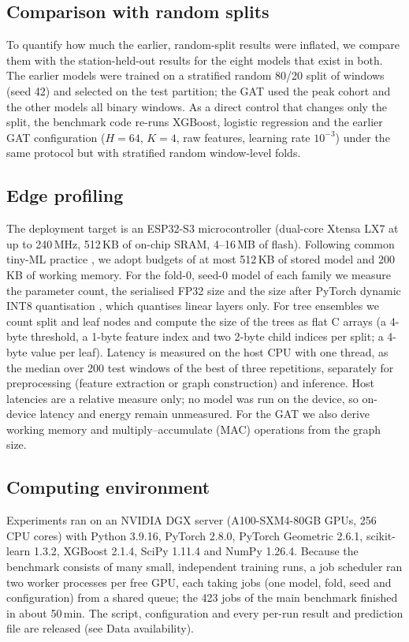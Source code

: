 \documentclass[a4paper,fleqn]{cas-dc}
\begin{document}
\subsection{Comparison with random splits}\label{sec:random-method}
To quantify how much the earlier, random-split results were inflated, we compare them
with the station-held-out results for the eight models that exist in both. The earlier
models were trained on a stratified random 80/20 split of windows (seed 42) and selected
on the test partition; the GAT used the peak cohort and the other models all binary
windows. As a direct control that changes only the split, the benchmark code re-runs
XGBoost, logistic regression and the earlier GAT configuration ($H=64$, $K=4$, raw
features, learning rate $10^{-3}$) under the same protocol but with stratified random
window-level folds. %

\subsection{Edge profiling}\label{sec:edge-method}
The deployment target is an ESP32-S3 microcontroller (dual-core Xtensa LX7 at up to
240\,MHz, 512\,KB of on-chip SRAM, 4--16\,MB of flash). Following common tiny-ML practice
\citep{banbury2021}, we adopt budgets of at most 512\,KB of stored model and 200\,KB of
working memory. For the fold-0, seed-0 model of each family we measure the parameter
count, the serialised FP32 size and the size after PyTorch dynamic INT8 quantisation
\citep{jacob2018}, which quantises linear layers only. For tree ensembles we count split
and leaf nodes and compute the size of the trees as flat C arrays (a 4-byte threshold,
a 1-byte feature index and two 2-byte child indices per split; a 4-byte value per leaf).
Latency is measured on the host CPU with one thread, as the median over 200 test windows
of the best of three repetitions, separately for preprocessing (feature extraction or
graph construction) and inference. Host latencies are a relative measure only; no model
was run on the device, so on-device latency and energy remain unmeasured. For the GAT we
also derive working memory and multiply--accumulate (MAC) operations from the graph size.

\subsection{Computing environment}\label{sec:env}
Experiments ran on an NVIDIA DGX server (A100-SXM4-80GB GPUs, 256 CPU cores) with
Python 3.9.16, PyTorch 2.8.0, PyTorch Geometric 2.6.1, scikit-learn 1.3.2, XGBoost 2.1.4,
SciPy 1.11.4 and NumPy 1.26.4. Because the benchmark consists of many small, independent
training runs, a job scheduler ran two worker processes per free GPU, each taking jobs
(one model, fold, seed and configuration) from a shared queue; the 423 jobs of the main
benchmark finished in about 50\,min. The script, configuration and every per-run result
and prediction file are released (see Data availability).
\end{document}
